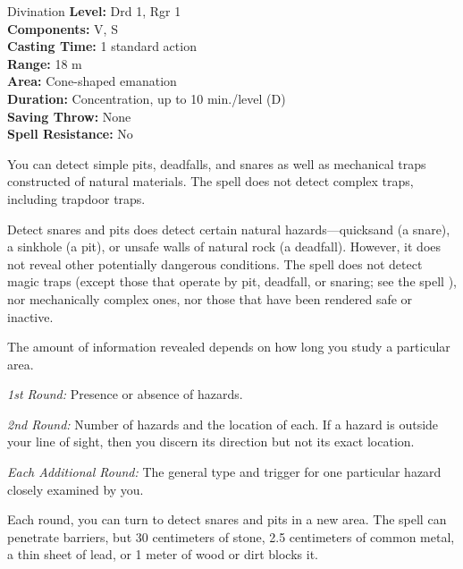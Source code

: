 {Divination}
{
	\textbf{Level:}
	Drd 1, Rgr 1\\
	\textbf{Components:}
	V, S\\
	\textbf{Casting Time:}
	1 standard action\\
	\textbf{Range:}
	18 m\\
	\textbf{Area:}
	Cone-shaped emanation\\
	\textbf{Duration:}
	Concentration, up to 10 min./level (D)\\
	\textbf{Saving Throw:}
	None\\
	\textbf{Spell Resistance:}
	No\\
}
{
	You can detect simple pits, deadfalls, and snares as well as mechanical traps constructed of natural materials. The spell does not detect complex traps, including trapdoor traps.

	Detect snares and pits does detect certain natural hazards---quicksand (a snare), a sinkhole (a pit), or unsafe walls of natural rock (a deadfall). However, it does not reveal other potentially dangerous conditions. The spell does not detect magic traps (except those that operate by pit, deadfall, or snaring; see the spell ), nor mechanically complex ones, nor those that have been rendered safe or inactive.

	The amount of information revealed depends on how long you study a particular area.

	\textit{1st Round:}
	Presence or absence of hazards.

	\textit{2nd Round:}
	Number of hazards and the location of each. If a hazard is outside your line of sight, then you discern its direction but not its exact location.

	\textit{Each Additional Round:}
	The general type and trigger for one particular hazard closely examined by you.

	Each round, you can turn to detect snares and pits in a new area. The spell can penetrate barriers, but 30 centimeters of stone, 2.5 centimeters of common metal, a thin sheet of lead, or 1 meter of wood or dirt blocks it.

}

